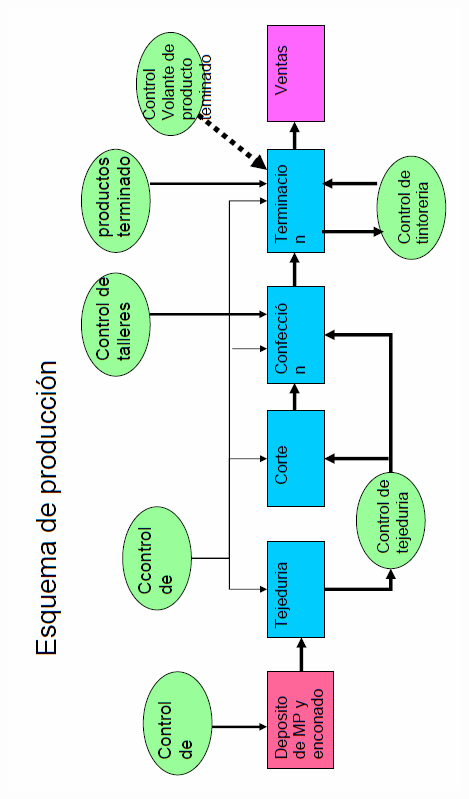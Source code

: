\documentclass[a4paper,10pt,titlepage]{article}
\begin{document}
\begin{center}
\includegraphics[scale=0.75]{./esquemaproduccionDolly.png}
\end{center}
\newpage
\end{document}
